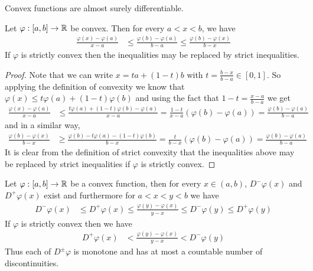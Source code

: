 Convex functions are almost surely differentiable.
\begin{lem}\label{ThreeChordLemma}Let $\varphi : [a,b] \to \mathbb{R}$ be convex.  Then for every
  $a < x < b$, we have
\begin{align*}
\frac{\varphi(x) - \varphi(a)}{x - a} &\leq \frac{\varphi(b) -
  \varphi(a)}{b - a}  \leq \frac{\varphi(b) - \varphi(x)}{b - x} 
\end{align*}
If $\varphi$ is strictly convex then the inequalities may be replaced
by strict inequalities.
\end{lem}
\begin{proof}
Note that we can write $x = t a + (1-t) b$
with $t = \frac{b-x}{b-a} \in [0,1]$.  So applying the definition of
convexity we know that $\varphi(x) \leq t \varphi(a) +
(1-t)\varphi(b)$ and using the fact that $1-t = \frac{x-a}{b-a}$ we get
\begin{align*}
\frac{\varphi(x) - \varphi(a)}{x - a} &\leq \frac{t \varphi(a) +
(1-t)\varphi(b) - \varphi(a)}{x - a} = \frac{1-t}{x-a} (\varphi(b) -
\varphi(a) ) = \frac{\varphi(b) -
  \varphi(a)}{b - a} 
\end{align*}
and in a similar way,
\begin{align*}
\frac{\varphi(b) - \varphi(x)}{b - x} &\geq \frac{ \varphi(b)  - t \varphi(a) -
(1-t)\varphi(b) }{b -x} = \frac{t}{b-x} (\varphi(b) -
\varphi(a) ) = \frac{\varphi(b) -
  \varphi(a)}{b - a} 
\end{align*}
It is clear from the definition of strict convexity that the
inequalities above may be replaced by strict inequalities if $\varphi$ is strictly convex.
\end{proof}
\begin{lem}\label{ConvexHasDini}Let $\varphi : [a,b] \to \mathbb{R}$ be a convex function, then
  for every $x \in (a,b)$, $D^-\varphi(x)$ and $D^+\varphi(x)$ exist
  and furthermore for $a < x < y < b$ we have
\begin{align*}
D^-\varphi(x) &\leq D^+\varphi(x) \leq \frac{\varphi(y) -
  \varphi(x)}{y - x} \leq D^-\varphi(y) \leq D^+\varphi(y)
\end{align*}
If $\varphi$ is strictly convex then we have
\begin{align*}
D^+\varphi(x) &< \frac{\varphi(y) -  \varphi(x)}{y - x} < D^-\varphi(y)
\end{align*}
Thus each of $D^\pm \varphi$ is monotone and has at most a countable number of discontinuities.
\end{lem}
